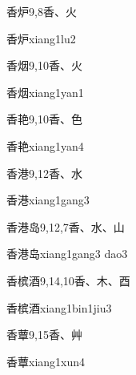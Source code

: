 \begin{entry}{香炉}{9,8}{⾹、⽕}
  \begin{phonetics}{香炉}{xiang1lu2}
  \end{phonetics}
\end{entry}

\begin{entry}{香烟}{9,10}{⾹、⽕}
  \begin{phonetics}{香烟}{xiang1yan1}
  \end{phonetics}
\end{entry}

\begin{entry}{香艳}{9,10}{⾹、⾊}
  \begin{phonetics}{香艳}{xiang1yan4}
  \end{phonetics}
\end{entry}

\begin{entry}{香港}{9,12}{⾹、⽔}
  \begin{phonetics}{香港}{xiang1gang3}
  \end{phonetics}
\end{entry}

\begin{entry}{香港岛}{9,12,7}{⾹、⽔、⼭}
  \begin{phonetics}{香港岛}{xiang1gang3 dao3}
  \end{phonetics}
\end{entry}

\begin{entry}{香槟酒}{9,14,10}{⾹、⽊、⾣}
  \begin{phonetics}{香槟酒}{xiang1bin1jiu3}
  \end{phonetics}
\end{entry}

\begin{entry}{香蕈}{9,15}{⾹、⾋}
  \begin{phonetics}{香蕈}{xiang1xun4}
  \end{phonetics}
\end{entry}


